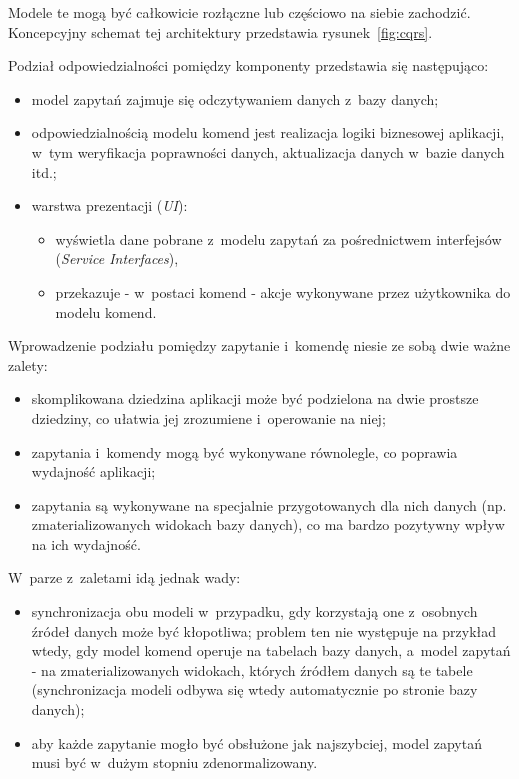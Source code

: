 Modele te mogą być całkowicie rozłączne lub częściowo na siebie zachodzić.
Koncepcyjny schemat tej architektury przedstawia rysunek~\ref{fig:cqrs}.



Podział odpowiedzialności pomiędzy komponenty przedstawia się następująco:

\begin{itemize}
 \item model zapytań zajmuje się odczytywaniem danych z~bazy danych;
 \item odpowiedzialnością modelu komend jest realizacja logiki biznesowej aplikacji, w~tym weryfikacja poprawności danych, aktualizacja danych w~bazie danych itd.;
 \item warstwa prezentacji (\emph{UI}):
  \begin{itemize}
   \item wyświetla dane pobrane z~modelu zapytań za pośrednictwem interfejsów (\emph{Service Interfaces}),
   \item przekazuje - w~postaci komend - akcje wykonywane przez użytkownika do modelu komend.
  \end{itemize}
\end{itemize}

Wprowadzenie podziału pomiędzy zapytanie i~komendę niesie ze sobą dwie ważne zalety:

\begin{itemize}
 \item skomplikowana dziedzina aplikacji może być podzielona na dwie prostsze dziedziny, co ułatwia jej zrozumiene i~operowanie na niej;
 \item zapytania i~komendy mogą być wykonywane równolegle, co poprawia wydajność aplikacji;
 \item zapytania są wykonywane na specjalnie przygotowanych dla nich danych (np. zmaterializowanych widokach bazy danych), co ma bardzo pozytywny wpływ na ich wydajność.
\end{itemize}

W~parze z~zaletami idą jednak wady:

\begin{itemize}
 \item synchronizacja obu modeli w~przypadku, gdy korzystają one z~osobnych źródeł danych może być kłopotliwa; problem ten nie występuje na przykład wtedy, gdy model komend operuje na tabelach bazy danych, a~model zapytań - na zmaterializowanych widokach, których źródłem danych są te tabele (synchronizacja modeli odbywa się wtedy automatycznie po stronie bazy danych);
 \item aby każde zapytanie mogło być obsłużone jak najszybciej, model zapytań musi być w~dużym stopniu zdenormalizowany.
\end{itemize}

